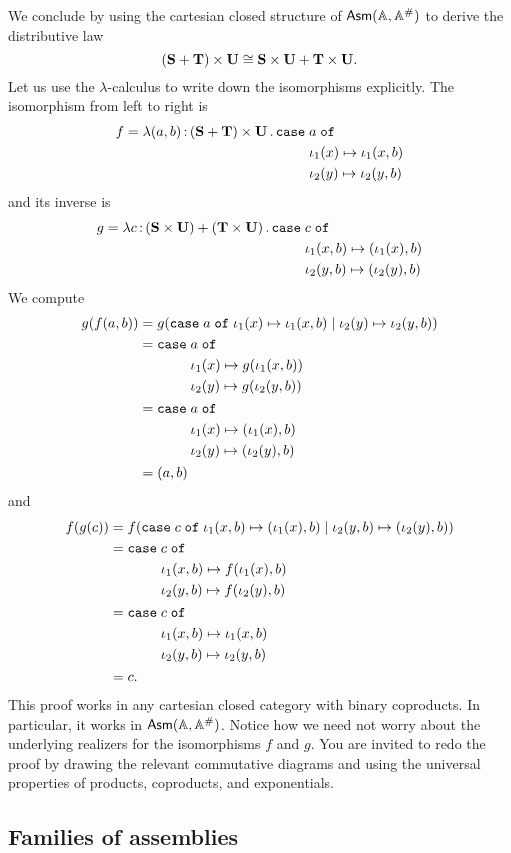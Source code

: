 We conclude by using the cartesian closed structure of $\mathsf{Asm}(\mathbb{A},\mathbb{A}^{\#})$ to
derive the distributive law
%
\begin{equation*}
  (\mathbf{S} + \mathbf{T}) \times \mathbf{U} \cong
  \mathbf{S} \times \mathbf{U} + \mathbf{T} \times \mathbf{U}.
\end{equation*}
%
Let us use the $\lambda$-calculus to write down the isomorphisms
explicitly. The isomorphism from left to right is
%
\begin{equation*}
  f = \xtlam{(a,b)}{(\asm{S} + \asm{T}) \times \asm{U}}{
    \xcase{a}
    {\iota_1(x)}{\iota_1(x, b)}
    {\iota_2(y)}{\iota_2(y, b)}
  }
\end{equation*}
%
and its inverse is
%
\begin{equation*}
  g = \xtlam{c}{(\asm{S} \times \asm{U}) + (\asm{T} \times \asm{U})}{
    \xcase{c}
    {\iota_1(x,b)}{(\iota_1(x), b)}
    {\iota_2(y,b)}{(\iota_2(y), b)}
  }
\end{equation*}
%
We compute
%
\begin{align*}
  g(f(a, b)) &=
  g(\mathtt{case}\;a\;\mathtt{of}\;\iota_1(x) \mapsto \iota_1(x, b) \mid \iota_2(y) \mapsto \iota_2(y, b)) \\
  &=
  \begin{aligned}[t]\mathtt{case}\;&a\;\mathtt{of}\\&\iota_1(x) \mapsto g(\iota_1(x, b)) \\&\iota_2(y) \mapsto g(\iota_2(y, b))\end{aligned} \\
  &=
  \begin{aligned}[t]\mathtt{case}\;&a\;\mathtt{of}\\&\iota_1(x) \mapsto (\iota_1(x), b) \\&\iota_2(y) \mapsto (\iota_2(y), b)\end{aligned} \\
  &=
  (a,b)
\end{align*}
%
and
\begin{align*}
  f(g(c)) &=
  f(
    \mathtt{case}\;c\;\mathtt{of}\;\iota_1(x,b) \mapsto (\iota_1(x), b) \mid \iota_2(y,b) \mapsto (\iota_2(y), b)
  )
  \\
  &=
  \begin{aligned}[t]\mathtt{case}\;&c\;\mathtt{of}\\&\iota_1(x,b) \mapsto f(\iota_1(x), b) \\&\iota_2(y,b) \mapsto f(\iota_2(y), b)\end{aligned}
  \\
  &=
  \begin{aligned}[t]\mathtt{case}\;&c\;\mathtt{of}\\&\iota_1(x,b) \mapsto \iota_1(x, b) \\&\iota_2(y,b) \mapsto \iota_2(y, b)\end{aligned} \\
  &=
  c.
\end{align*}
%
This proof works in any cartesian closed category with binary
coproducts. In particular, it works in $\mathsf{Asm}(\mathbb{A},\mathbb{A}^{\#})$. Notice how we need not
worry about the underlying realizers for the isomorphisms $f$ and $g$.
You are invited to redo the proof by drawing the relevant commutative
diagrams and using the universal properties of products, coproducts,
and exponentials.


\subsection{Families of assemblies}
\label{sec:families-assemblies}

